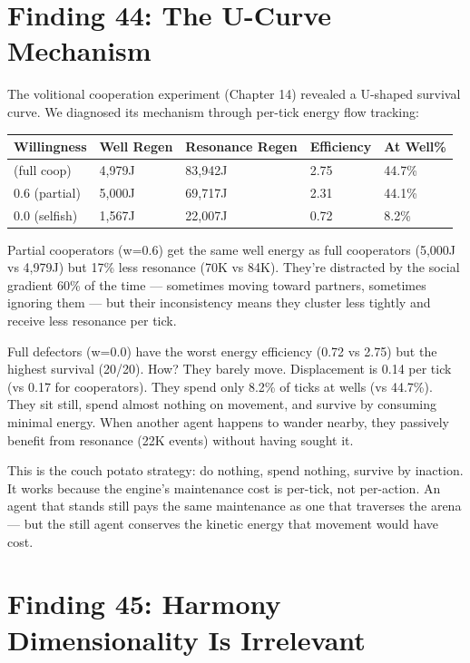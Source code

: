 \section{Finding 44: The U-Curve Mechanism}\label{finding-44-the-u-curve-mechanism}

The volitional cooperation experiment (Chapter 14) revealed a U-shaped survival curve. We diagnosed its mechanism through per-tick energy flow tracking:

\begin{longtable}[]{@{}lllll@{}}
\toprule\noalign{}
Willingness & Well Regen & Resonance Regen & Efficiency & At Well\% \\
\midrule\noalign{}
\endhead
\bottomrule\noalign{}
\endlastfoot
1.0 (full coop) & 4,979J & 83,942J & 2.75 & 44.7\% \\
0.6 (partial) & 5,000J & 69,717J & 2.31 & 44.1\% \\
0.0 (selfish) & 1,567J & 22,007J & 0.72 & 8.2\% \\
\end{longtable}

Partial cooperators (w=0.6) get the same well energy as full cooperators (5,000J vs 4,979J) but 17\% less resonance (70K vs 84K). They're distracted by the social gradient 60\% of the time --- sometimes moving toward partners, sometimes ignoring them --- but their inconsistency means they cluster less tightly and receive less resonance per tick.

Full defectors (w=0.0) have the worst energy efficiency (0.72 vs 2.75) but the highest survival (20/20). How? They barely move. Displacement is 0.14 per tick (vs 0.17 for cooperators). They spend only 8.2\% of ticks at wells (vs 44.7\%). They sit still, spend almost nothing on movement, and survive by consuming minimal energy. When another agent happens to wander nearby, they passively benefit from resonance (22K events) without having sought it.

This is the couch potato strategy: do nothing, spend nothing, survive by inaction. It works because the engine's maintenance cost is per-tick, not per-action. An agent that stands still pays the same maintenance as one that traverses the arena --- but the still agent conserves the kinetic energy that movement would have cost.

\section{Finding 45: Harmony Dimensionality Is Irrelevant}\label{finding-45-harmony-dimensionality-is-irrelevant}

